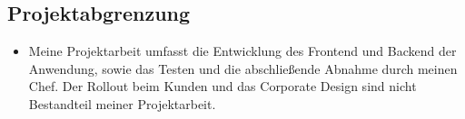 \subsection{Projektabgrenzung}
\label{sec:Projektabgrenzung}
\begin{itemize}
    \item Meine Projektarbeit umfasst die Entwicklung des Frontend und Backend der Anwendung, sowie das Testen und die abschließende Abnahme durch meinen Chef. Der Rollout beim Kunden und das Corporate Design sind nicht Bestandteil meiner Projektarbeit.
\end{itemize}
